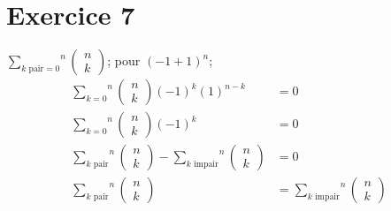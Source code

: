 \documentclass[fontsize=10pt]{article}
\begin{document}
\section*{Exercice 7}
$\overset{n}{\underset{k \text{ pair} = 0}{\sum}}
\begin{pmatrix} 
n\\
k
\end{pmatrix}$; pour $(-1+1)^n$;
\begin{align*}
\overset{n}{\underset{k= 0}{\sum}}
\begin{pmatrix} 
n\\
k
\end{pmatrix}(-1)^k(1)^{n-k} &= 0\\
\overset{n}{\underset{k= 0}{\sum}}
\begin{pmatrix} 
n\\
k
\end{pmatrix}(-1)^k &=0\\
\overset{n}{\underset{k \text{ pair}}{\sum}}
\begin{pmatrix} 
n\\
k
\end{pmatrix}
-
\overset{n}{\underset{k\text{ impair}}{\sum}}
\begin{pmatrix} 
n\\
k
\end{pmatrix} &=0\\
\overset{n}{\underset{k \text{ pair}}{\sum}}
\begin{pmatrix} 
n\\
k
\end{pmatrix}
&=
\overset{n}{\underset{k\text{ impair}}{\sum}}
\begin{pmatrix} 
n\\
k
\end{pmatrix}
\end{align*}
\end{document}
